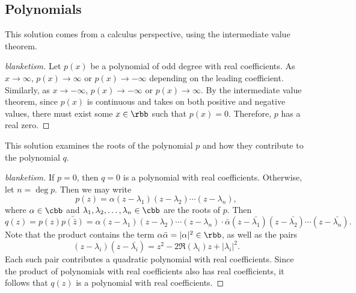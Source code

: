 \subsection{Polynomials}


This solution comes from a calculus perspective, using the intermediate value theorem.

\begin{proof}[blanketism]
    Let $p(x)$ be a polynomial of odd degree with real coefficients.
	As $x \to \infty$, $p(x) \to \infty$ or $p(x) \to -\infty$ depending on the leading coefficient.
	Similarly, as $x \to -\infty$, $p(x) \to -\infty$ or $p(x) \to \infty$.
	By the intermediate value theorem, since $p(x)$ is continuous and takes on both positive and negative values, there must exist some $x \in \rbb$ such that $p(x) = 0$.
	Therefore, $p$ has a real zero.
\end{proof}


This solution examines the roots of the polynomial $p$ and how they contribute to the polynomial $q$.

\begin{proof}[blanketism]
    If $p = 0$, then $q = 0$ is a polynomial with real coefficients.
	Otherwise, let $n = \deg p$.
	Then we may write
    \[
    	p(z) = \alpha(z - \lambda_1)(z - \lambda_2) \cdots (z - \lambda_n),
    \]
    where $\alpha \in \cbb$ and $\lambda_1, \lambda_2, \ldots, \lambda_n \in \cbb$ are the roots of $p$.
	Then
    \[
    	q(z) = p(z) \bar{p(\bar{z})} = \alpha(z - \lambda_1)(z - \lambda_2) \cdots (z - \lambda_n) \cdot \bar{\alpha} (z - \bar{\lambda_1}) (z - \bar{\lambda_2}) \cdots (z - \bar{\lambda_n}).
    \]
    Note that the product contains the term $\alpha\bar\alpha = |\alpha|^2 \in \rbb$, as well as the pairs
    \[
    	(z - \lambda_i)(z - \bar{\lambda_i}) = z^2 - 2\Re(\lambda_i) z + |\lambda_i|^2.
    \]
    Each such pair contributes a quadratic polynomial with real coefficients.
	Since the product of polynomials with real coefficients also has real coefficients, it follows that $q(z)$ is a polynomial with real coefficients.
\end{proof}